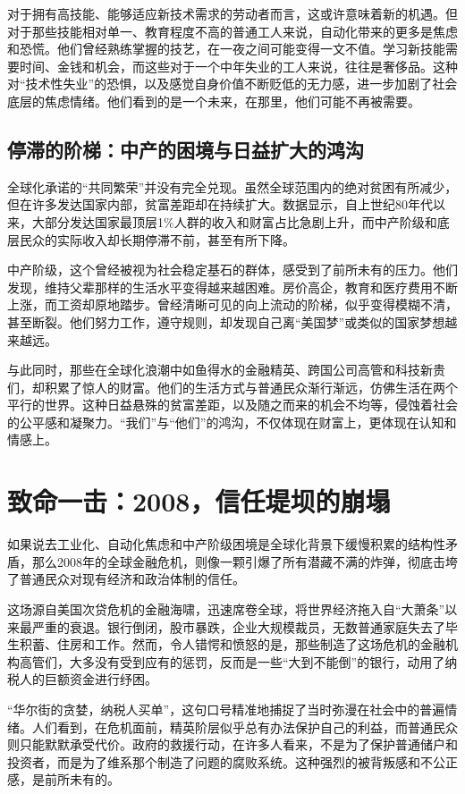 对于拥有高技能、能够适应新技术需求的劳动者而言，这或许意味着新的机遇。但对于那些技能相对单一、教育程度不高的普通工人来说，自动化带来的更多是焦虑和恐慌。他们曾经熟练掌握的技艺，在一夜之间可能变得一文不值。学习新技能需要时间、金钱和机会，而这些对于一个中年失业的工人来说，往往是奢侈品。这种对“技术性失业”的恐惧，以及感觉自身价值不断贬低的无力感，进一步加剧了社会底层的焦虑情绪。他们看到的是一个未来，在那里，他们可能不再被需要。

\subsection{停滞的阶梯：中产的困境与日益扩大的鸿沟}

全球化承诺的“共同繁荣”并没有完全兑现。虽然全球范围内的绝对贫困有所减少，但在许多发达国家内部，贫富差距却在持续扩大。数据显示，自上世纪80年代以来，大部分发达国家最顶层1\%人群的收入和财富占比急剧上升，而中产阶级和底层民众的实际收入却长期停滞不前，甚至有所下降。

中产阶级，这个曾经被视为社会稳定基石的群体，感受到了前所未有的压力。他们发现，维持父辈那样的生活水平变得越来越困难。房价高企，教育和医疗费用不断上涨，而工资却原地踏步。曾经清晰可见的向上流动的阶梯，似乎变得模糊不清，甚至断裂。他们努力工作，遵守规则，却发现自己离“美国梦”或类似的国家梦想越来越远。

与此同时，那些在全球化浪潮中如鱼得水的金融精英、跨国公司高管和科技新贵们，却积累了惊人的财富。他们的生活方式与普通民众渐行渐远，仿佛生活在两个平行的世界。这种日益悬殊的贫富差距，以及随之而来的机会不均等，侵蚀着社会的公平感和凝聚力。“我们”与“他们”的鸿沟，不仅体现在财富上，更体现在认知和情感上。

\section{致命一击：2008，信任堤坝的崩塌}

如果说去工业化、自动化焦虑和中产阶级困境是全球化背景下缓慢积累的结构性矛盾，那么2008年的全球金融危机，则像一颗引爆了所有潜藏不满的炸弹，彻底击垮了普通民众对现有经济和政治体制的信任。

这场源自美国次贷危机的金融海啸，迅速席卷全球，将世界经济拖入自“大萧条”以来最严重的衰退。银行倒闭，股市暴跌，企业大规模裁员，无数普通家庭失去了毕生积蓄、住房和工作。然而，令人错愕和愤怒的是，那些制造了这场危机的金融机构高管们，大多没有受到应有的惩罚，反而是一些“大到不能倒”的银行，动用了纳税人的巨额资金进行纾困。

“华尔街的贪婪，纳税人买单”，这句口号精准地捕捉了当时弥漫在社会中的普遍情绪。人们看到，在危机面前，精英阶层似乎总有办法保护自己的利益，而普通民众则只能默默承受代价。政府的救援行动，在许多人看来，不是为了保护普通储户和投资者，而是为了维系那个制造了问题的腐败系统。这种强烈的被背叛感和不公正感，是前所未有的。

